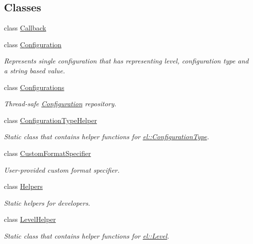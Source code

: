 \subsection*{Classes}
\begin{DoxyCompactItemize}
\item 
class \hyperlink{classel_1_1_callback}{Callback}
\item 
class \hyperlink{classel_1_1_configuration}{Configuration}
\begin{DoxyCompactList}\small\item\em Represents single configuration that has representing level, configuration type and a string based value. \end{DoxyCompactList}\item 
class \hyperlink{classel_1_1_configurations}{Configurations}
\begin{DoxyCompactList}\small\item\em Thread-\/safe \hyperlink{classel_1_1_configuration}{Configuration} repository. \end{DoxyCompactList}\item 
class \hyperlink{classel_1_1_configuration_type_helper}{Configuration\+Type\+Helper}
\begin{DoxyCompactList}\small\item\em Static class that contains helper functions for \hyperlink{namespaceel_a281f5db6d6163678bc68a8b23b59e124}{el\+::\+Configuration\+Type}. \end{DoxyCompactList}\item 
class \hyperlink{classel_1_1_custom_format_specifier}{Custom\+Format\+Specifier}
\begin{DoxyCompactList}\small\item\em User-\/provided custom format specifier. \end{DoxyCompactList}\item 
class \hyperlink{classel_1_1_helpers}{Helpers}
\begin{DoxyCompactList}\small\item\em Static helpers for developers. \end{DoxyCompactList}\item 
class \hyperlink{classel_1_1_level_helper}{Level\+Helper}
\begin{DoxyCompactList}\small\item\em Static class that contains helper functions for \hyperlink{namespaceel_ab0ac6091262344c52dd2d3ad099e8e36}{el\+::\+Level}. \end{DoxyCompactList}\item 

\end{DoxyCompactItemize}
